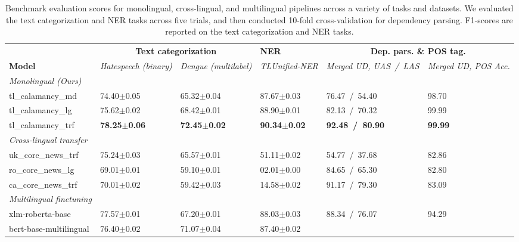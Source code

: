 \documentclass[../emnlp2023.tex]{subfiles}
\begin{document}
\begin{table*}[t]
\begin{tabular}{@{}p{4cm}p{2cm}p{2cm}p{2cm}p{2cm}p{2cm}@{}}
\toprule
                           & \multicolumn{2}{c}{\textbf{Text categorization}} & \textbf{NER} & \multicolumn{2}{c}{\textbf{Dep. pars. \& POS tag.}}                         \\ 
\textbf{Model}             & \textit{Hatespeech (binary)} & \textit{Dengue (multilabel)} & \textit{TLUnified-NER} & \textit{Merged UD, UAS~/~LAS} & \textit{Merged UD, POS Acc.} \\ \midrule 
\textit{Monolingual (Ours)}              \\
tl\_calamancy\_md          & 74.40$\pm$0.05 & 65.32$\pm$0.04 & 87.67$\pm$0.03 & 76.47~/~54.40 & 98.70\\
tl\_calamancy\_lg          & 75.62$\pm$0.02 & 68.42$\pm$0.01 & 88.90$\pm$0.01 & 82.13~/~70.32 & 99.99\\
tl\_calamancy\_trf         & \textbf{78.25$\pm$0.06} & \textbf{72.45$\pm$0.02} & \textbf{90.34$\pm$0.02} & \textbf{92.48~/~80.90} & \textbf{99.99} \\ \midrule
\textit{Cross-lingual transfer} \\
uk\_core\_news\_trf        & 75.24$\pm$0.03 & 65.57$\pm$0.01 & 51.11$\pm$0.02 & 54.77~/~37.68 & 82.86 \\
ro\_core\_news\_lg         & 69.01$\pm$0.01 & 59.10$\pm$0.01 & 02.01$\pm$0.00 & 84.65~/~65.30 & 82.80 \\
ca\_core\_news\_trf        & 70.01$\pm$0.02 & 59.42$\pm$0.03 & 14.58$\pm$0.02 & 91.17~/~79.30 & 83.09 \\ \midrule
\textit{Multilingual finetuning} \\
xlm-roberta-base          & 77.57$\pm$0.01 & 67.20$\pm$0.01 & 88.03$\pm$0.03 & 88.34~/~76.07 & 94.29 \\
bert-base-multilingual    & 76.40$\pm$0.02 & 71.07$\pm$0.04 & 87.40$\pm$0.02\\
\bottomrule
\end{tabular}
\caption{
    Benchmark evaluation scores for monolingual, cross-lingual, and multilingual pipelines across a variety of tasks and datasets.
    We evaluated the text categorization and NER tasks across five trials, and then conducted 10-fold cross-validation for dependency parsing.
    F1-scores are reported on the text categorization and NER tasks.
}
\label{table:results}
\end{table*}
\end{document}
